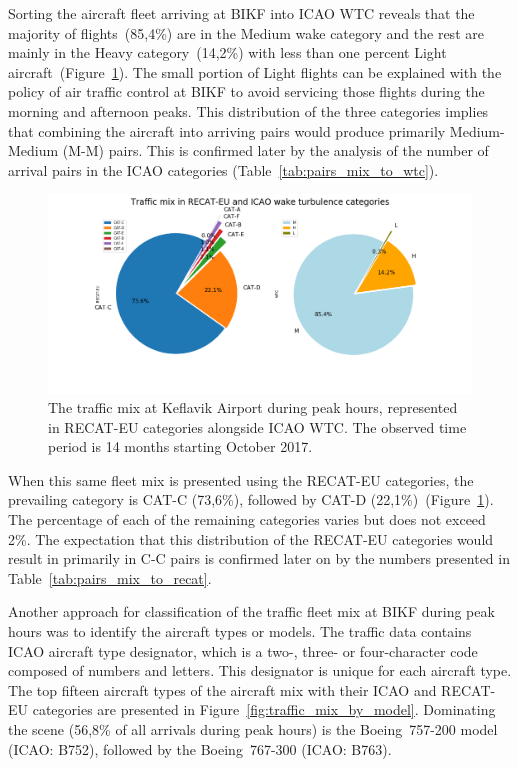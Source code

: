 Sorting the aircraft fleet arriving at BIKF into ICAO WTC reveals that the majority of flights~(85,4\%) are in the Medium wake category and the rest are mainly in the Heavy category~(14,2\%) with less than one percent Light aircraft~(Figure~\ref{fig:post_fast_exit_mix_pie_v2}). The small portion of Light flights can be explained with the policy of air traffic control at BIKF to avoid servicing those flights during the morning and afternoon peaks. This distribution of the three categories implies that combining the aircraft into arriving pairs would produce primarily Medium-Medium (M-M) pairs. This is confirmed later by the analysis of the number of arrival pairs in the ICAO categories (Table~\ref{tab:pairs_mix_to_wtc}).

\begin{figure}[h]
    \centering
    \includegraphics[width=1\textwidth]{graphics/fig_post_fast_exit_mix_pie_v2.png}
    \caption[Traffic mix in RECAT-EU and ICAO WTC]{The traffic mix at Keflavik Airport during peak hours, represented in RECAT-EU categories alongside ICAO WTC. The observed time period is 14 months starting October 2017.}
    \label{fig:post_fast_exit_mix_pie_v2}
\end{figure}

When this same fleet mix is presented using the RECAT-EU categories, the prevailing category is CAT-C (73,6\%), followed by CAT-D (22,1\%)~(Figure~\ref{fig:post_fast_exit_mix_pie_v2}). The percentage of each of the remaining categories varies but does not exceed 2\%. The expectation that this distribution of the RECAT-EU categories would result in primarily in C-C pairs is confirmed later on by the numbers presented in Table~\ref{tab:pairs_mix_to_recat}. 

Another approach for classification of the traffic fleet mix at BIKF during peak hours was to identify the aircraft types or models. The traffic data contains ICAO aircraft type designator, which is a two-, three- or four-character code composed of numbers and letters. This designator is unique for each aircraft type. The top fifteen aircraft types of the aircraft mix with their ICAO and RECAT-EU categories are presented in Figure~\ref{fig:traffic_mix_by_model}. Dominating the scene (56,8\% of all arrivals during peak hours) is the Boeing~757-200 model (ICAO: B752), followed by the Boeing~767-300 (ICAO: B763).


